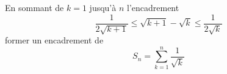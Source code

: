En sommant de $k=1$ jusqu'\`a $n$ l'encadrement
\[\dfrac{1}{2\sqrt{k+1}}\leq \sqrt{k+1}-\sqrt{k}\leq \dfrac{1}{2\sqrt{k}}\]
former un encadrement de 
\[S_n=\sum _{k=1}^n \dfrac{1}{\sqrt{k}}\]
\bigskip